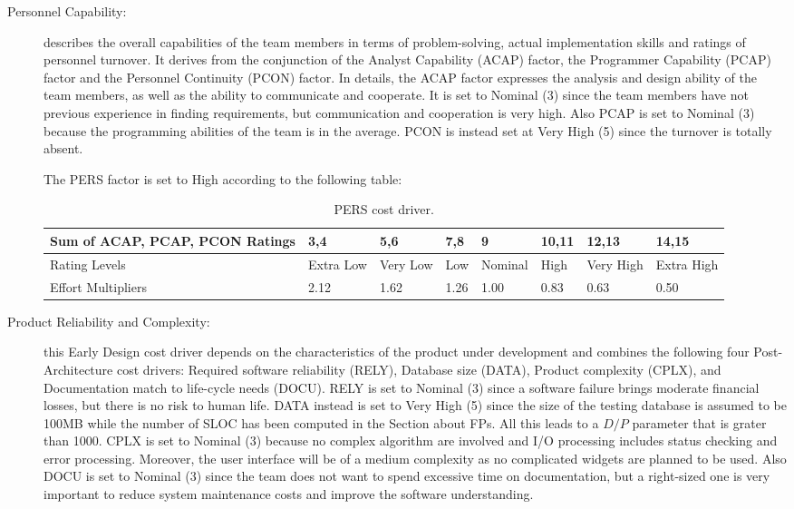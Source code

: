\begin{description}
\item[Personnel Capability:] describes the overall capabilities of the team members in terms of problem-solving, actual implementation skills and ratings of personnel turnover. It derives from the conjunction of the Analyst Capability (ACAP) factor, the Programmer Capability (PCAP) factor and the Personnel Continuity (PCON) factor. In details, the ACAP factor expresses the analysis and design ability of the team members, as well as the ability to communicate and cooperate. It is set to Nominal (3) since the team members have not previous experience in finding requirements, but  communication and cooperation is very high. Also PCAP is set to Nominal (3) because the programming abilities of the team is in the average. PCON is instead set at Very High (5) since the turnover is totally absent.

The PERS factor is set to High according to the following table:

\begin{table}[H]
	\begin{adjustwidth}{-.5in}{-.5in}
    \centering
    \begin{tabular}{p{4cm}|p{1cm}|p{1cm}|p{1cm}|p{1.5cm}|p{1cm}|p{1cm}|p{1cm}}
        \hline
        Sum of ACAP, PCAP, PCON Ratings & 3,4 & 5,6 & 7,8 & 9 & 10,11 & 12,13 & 14,15 \\
        \hline
        \hline
        Rating Levels & Extra Low & Very Low & Low & Nominal & High & Very High & Extra High \\
        \hline
        Effort Multipliers & 2.12 & 1.62 & 1.26 & 1.00 & 0.83 & 0.63 & 0.50 \\
        \hline
    \end{tabular}
    \caption{PERS cost driver.}
    \end{adjustwidth}
\end{table}

\item[Product Reliability and Complexity:] this Early Design cost driver depends on the characteristics of the product under development and combines the following four Post-Architecture cost drivers: Required software reliability (RELY), Database size (DATA), Product complexity (CPLX), and Documentation match to life-cycle needs (DOCU). RELY is set to Nominal (3) since a software failure brings moderate financial losses, but there is no risk to human life. DATA instead is set to Very High (5) since the size of the testing database is assumed to be 100MB while the number of SLOC has been computed in the Section about FPs. All this leads to a $D/P$ parameter that is grater than 1000. CPLX is set to Nominal (3) because no complex algorithm are involved and I/O processing includes status checking and error processing. Moreover, the user interface will be of a medium complexity as no complicated widgets are planned to be used. Also DOCU is set to Nominal (3) since the team does not want to spend excessive time on documentation, but a right-sized one is very important to reduce system maintenance costs and improve the software understanding.


\end{description}

